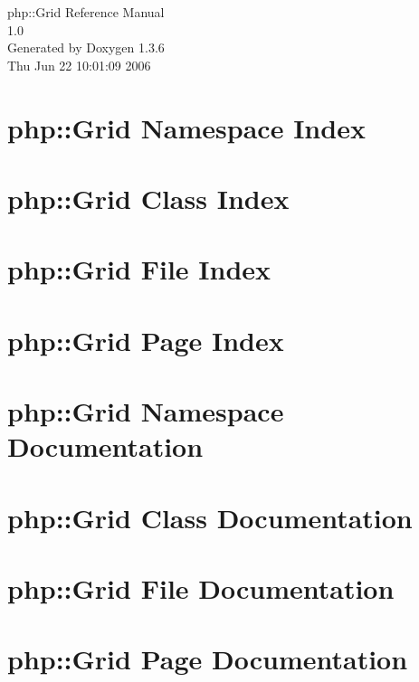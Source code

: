 \documentclass[a4paper]{book}
\begin{document}
\begin{titlepage}
\vspace*{7cm}
\begin{center}
{\Large php::Grid Reference Manual\\[1ex]\large 1.0 }\\
\vspace*{1cm}
{\large Generated by Doxygen 1.3.6}\\
\vspace*{0.5cm}
{\small Thu Jun 22 10:01:09 2006}\\
\end{center}
\end{titlepage}
\clearemptydoublepage
{}
\tableofcontents
\clearemptydoublepage
{}
\chapter{php::Grid Namespace Index}

\chapter{php::Grid Class Index}

\chapter{php::Grid File Index}

\chapter{php::Grid Page Index}

\chapter{php::Grid Namespace Documentation}




\chapter{php::Grid Class Documentation}

\chapter{php::Grid File Documentation}









\chapter{php::Grid Page Documentation}

\printindex
\end{document}
